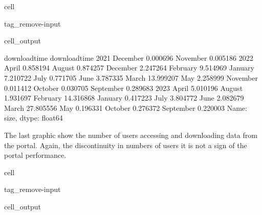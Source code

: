 \documentclass[letterpaper,10pt,english]{jupyterBook}
\begin{document}
\begin{sphinxuseclass}{cell}
\begin{sphinxuseclass}{tag_remove-input}\begin{sphinxVerbatimOutput}

\begin{sphinxuseclass}{cell_output}
\begin{sphinxVerbatim}[commandchars=\\\{\}]
download\PYGZus{}time  download\PYGZus{}time
2021           December          0.000696
               November          0.005186
2022           April             0.858194
               August            0.874257
               December          2.247264
               February          9.514969
               January           7.210722
               July              0.771705
               June              3.787335
               March            13.999207
               May               2.258999
               November          0.011412
               October           0.030705
               September         0.289683
2023           April             5.010196
               August            1.931697
               February         14.316868
               January           0.417223
               July              3.804772
               June              2.082679
               March            27.805556
               May               0.196331
               October           0.276372
               September         0.220003
Name: size, dtype: float64
\end{sphinxVerbatim}

\end{sphinxuseclass}\end{sphinxVerbatimOutput}

\end{sphinxuseclass}
\end{sphinxuseclass}
\sphinxAtStartPar
The last graphic show the number of users accessing and downloading data from the portal. Again, the discontinuity in numbers of users it is not a sign of the portal performance.

\begin{sphinxuseclass}{cell}
\begin{sphinxuseclass}{tag_remove-input}\begin{sphinxVerbatimOutput}

\begin{sphinxuseclass}{cell_output}
\noindent{}

\end{sphinxuseclass}\end{sphinxVerbatimOutput}

\end{sphinxuseclass}
\end{sphinxuseclass}
\sphinxstepscope
\end{document}

